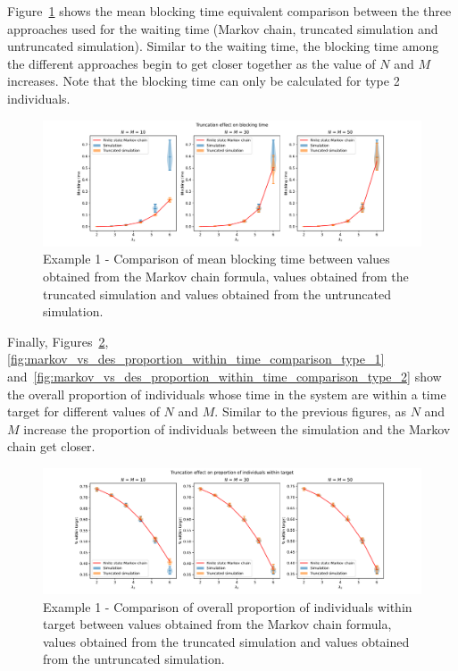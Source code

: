 Figure~\ref{fig:markov_vs_des_blocking_time_comparison_overall} shows
the mean blocking time equivalent comparison between the three approaches used
for the waiting time (Markov chain, truncated simulation and untruncated
simulation).
Similar to the waiting time, the blocking time among the different approaches
begin to get closer together as the value of \(N\) and \(M\) increases.
Note that the blocking time can only be calculated for type 2 individuals.

\begin{figure}[H]
    \includegraphics[width=\textwidth]{chapters/03_queueing_model/Bin/numeric_results_and_timings/truncation_effect/blocking_time_type_2.pdf}
    \caption{
        Example 1 - Comparison of mean blocking time between values obtained
        from the Markov
        chain formula, values obtained from the truncated simulation and values
        obtained from the untruncated simulation.
    }
    \label{fig:markov_vs_des_blocking_time_comparison_overall}
\end{figure}

Finally, Figures~\ref{fig:markov_vs_des_proportion_within_time_comparison_overall},
\ref{fig:markov_vs_des_proportion_within_time_comparison_type_1}
and~\ref{fig:markov_vs_des_proportion_within_time_comparison_type_2} show the
overall proportion of individuals whose time in the system are within
a time target for different values of \(N\) and \(M\).
Similar to the previous figures, as \(N\) and \(M\) increase the proportion of
individuals between the simulation and the Markov chain get closer.


\begin{figure}[H]
    \includegraphics[width=\textwidth]{chapters/03_queueing_model/Bin/numeric_results_and_timings/truncation_effect/proportion_overall.pdf}
    \caption{
        Example 1 - Comparison of overall proportion of individuals within
        target between values obtained from the
        Markov chain formula, values obtained from the truncated simulation and
        values obtained from the untruncated simulation.
    }
    \label{fig:markov_vs_des_proportion_within_time_comparison_overall}
\end{figure}

